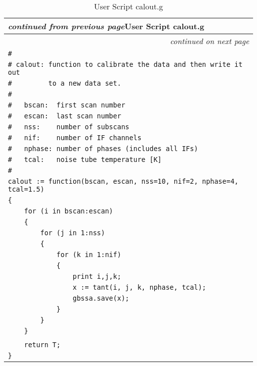 \setlongtables
\begin{longtable}[c]{|l|}
\caption{User Script calout.g}\label{calout} \\
\cline{1-1}
\endfirsthead
\multicolumn{1}{l}{\hspace{9mm}\footnotesize{\slshape
 continued from previous page}\hfill{User Script calout.g}} \\
\cline{1-1}
\endhead
\cline{1-1}
\multicolumn{1}{r}{\small \slshape
 continued on next page} \\
\endfoot
\cline{1-1}
\endlastfoot
{\slshape\small}
\verb|#| \\
\verb|# calout: function to calibrate the data and then write it out| \\
\verb|#         to a new data set.| \\
\verb|#   | \\
\verb|#   bscan:  first scan number| \\
\verb|#   escan:  last scan number| \\
\verb|#   nss:    number of subscans| \\
\verb|#   nif:    number of IF channels| \\
\verb|#   nphase: number of phases (includes all IFs)| \\
\verb|#   tcal:   noise tube temperature [K]| \\
\verb|#| \\
\verb|calout := function(bscan, escan, nss=10, nif=2, nphase=4, tcal=1.5)| \\
\verb|{| \\
\verb|    for (i in bscan:escan)| \\
\verb|    {| \\
\verb|        for (j in 1:nss)| \\
\verb|        {| \\
\verb|            for (k in 1:nif)| \\
\verb|            {| \\
\verb|                print i,j,k;| \\
\verb|                x := tant(i, j, k, nphase, tcal);| \\
\verb|                gbssa.save(x);| \\
\verb|            }| \\
\verb|        }    | \\
\verb|    }| \\
\verb|| \\
\verb|    return T;| \\
\verb|}| \\
\end{longtable}
